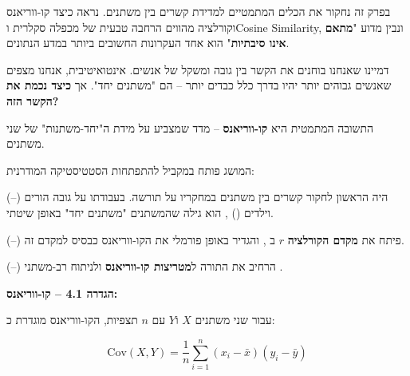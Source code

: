 

\noindent\textbf{}

\vspace{0.5cm}

בפרק זה נחקור את הכלים המתמטיים למדידת קשרים בין משתנים. נראה כיצד קו-ווריאנס וקורלציה מהווים הרחבה טבעית של מכפלה סקלרית ו\en{-}Cosine Similarity, ונבין מדוע "\textbf{מתאם אינו סיבתיות}" הוא אחד העקרונות החשובים ביותר במדע הנתונים.


דמיינו שאנחנו בוחנים את הקשר בין גובה ומשקל של אנשים. אינטואיטיבית, אנחנו מצפים שאנשים גבוהים יותר יהיו בדרך כלל כבדים יותר – הם "משתנים יחד". אך \textbf{כיצד נכמת את הקשר הזה?}

התשובה המתמטית היא \textbf{קו-ווריאנס}  – מדד שמצביע על מידת ה"יחד-משתנות" של שני משתנים.


המושג פותח במקביל להתפתחות הסטטיסטיקה המודרנית:

\textbf{} (–) היה הראשון לחקור קשרים בין משתנים במחקריו על תורשה. בעבודתו על גובה הורים וילדים () \cite{galton1886}, הוא גילה שהמשתנים "משתנים יחד" באופן שיטתי.

\textbf{} (–) פיתח את \textbf{מקדם הקורלציה} $r$ ב\en{-} \cite{pearson1896}, והגדיר באופן פורמלי את הקו-ווריאנס כבסיס למקדם זה.

\textbf{} (–) הרחיב את התורה ל\textbf{מטריצות קו-ווריאנס}  ולניתוח רב-משתני \cite{fisher1925}.


\textbf{הגדרה \num{4.1} – קו-ווריאנס:}

עבור שני משתנים $X$ ו\en{-}$Y$ עם $n$ תצפיות, הקו-ווריאנס מוגדרת כ:

\begin{equation}
\text{Cov}(X, Y) = \frac{1}{n} \sum_{i=1}^{n} (x_i - \bar{x})(y_i - \bar{y})
\end{equation}

